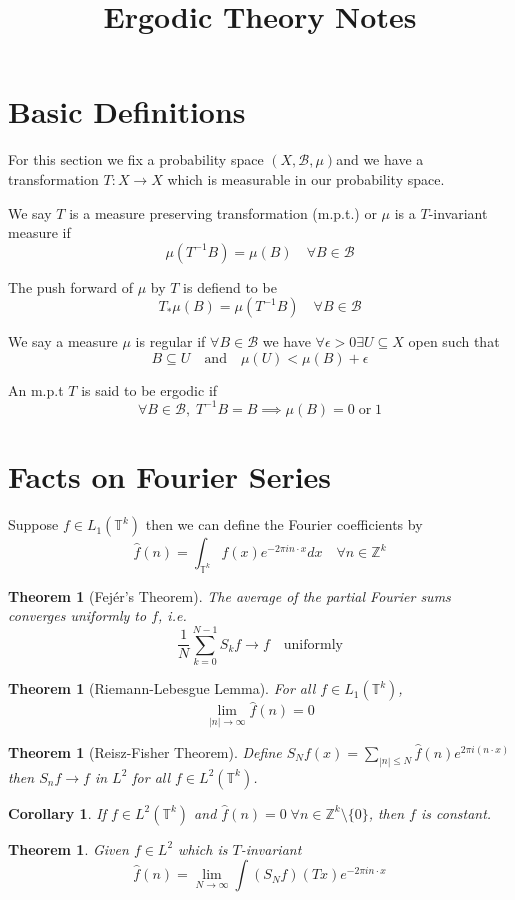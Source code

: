 \documentclass[11pt]{article}
\title{Ergodic Theory Notes}
\author{}
\date{}
\newcommand{\abs}[1]{\left|#1\right|}
\newcommand{\msrspc}{\ensuremath{(X,\mathcal{B},\mu)}}
\newcommand{\ktor}{\mathbb{T}^k}
\newcommand{\Z}{\mathbb{Z}}
\newenvironment{defin}
	{\begin{mdframed}[backgroundcolor=white, roundcorner=5pt, linewidth=1pt]}
	{\end{mdframed}}
\newcommand{\mdf}[1]{{\color{red} #1}}
\newtheorem{theorem}[prop]{Theorem}
\newtheorem{cor}[prop]{Corollary}
\begin{document}
\maketitle

\section{Basic Definitions}

For this section we fix a probability space \msrspc and we have a transformation $T:X\to X$ which is measurable in our probability space.

\begin{defin}
	
We say $T$ is a \mdf{measure preserving transformation (m.p.t.)} or $\mu$ is a \mdf{$T$-invariant measure} if 
$$\mu(T^{-1}B)=\mu(B)\quad\forall B\in\mathcal{B}$$

The \mdf{push forward of $\mu$ by $T$} is defiend to be
	$$T_*\mu(B)=\mu(T^{-1}B)\quad\forall B \in\mathcal{B}$$

We say a measure $\mu$ is \mdf{regular} if $\forall B\in\mathcal{B}$ we have $\forall\epsilon >0 \exists U\subseteq X$ open such that
$$B\subseteq U \quad \text{and} \quad \mu(U) < \mu(B) + \epsilon$$

An m.p.t $T$ is said to be \mdf{ergodic} if
$$\forall B\in\mathcal{B},\; T^{-1}B=B \implies \mu(B)=0\;\text{or}\;1$$

\end{defin}

\section{Facts on Fourier Series}
Suppose $f\in L_1(\ktor)$ then we can define the \mdf{Fourier coefficients} by
$$\hat{f}(n)=\int_{\ktor}f(x)e^{-2\pi in\cdot x}dx\quad\forall n\in\Z^k$$
\begin{theorem}[Fej\'er's Theorem]
The average of the partial Fourier sums converges uniformly to $f$, i.e.
$$\frac{1}{N}\sum_{k=0}^{N-1}S_kf\to f\quad\text{uniformly}$$
\end{theorem}
\begin{theorem}[Riemann-Lebesgue Lemma]
	For all $f\in L_1(\ktor)$, $$\lim_{\abs{n}\to\infty}\hat{f}(n)=0$$
\end{theorem}
\begin{theorem}[Reisz-Fisher Theorem]
Define $S_Nf(x)=\sum_{\abs{n}\leq N}\hat{f}(n)e^{2\pi i (n\cdot x)}$
then $S_nf\to f$ in $L^2$ for all $f\in L^2(\ktor)$.
\end{theorem}
\begin{cor}
If $f\in L^2(\ktor)$ and $\hat{f}(n)=0\;\forall n\in\Z^k\setminus\{0\}$, then $f$ is constant.
\end{cor}
\begin{theorem}
Given $f\in L^2$ which is $T$-invariant
$$\hat{f}(n)=\lim_{N\to\infty}\int (S_N f)(Tx)e^{-2\pi i n\cdot x}$$
\end{theorem}
\end{document}
